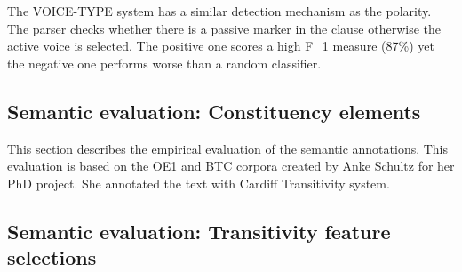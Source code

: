 The VOICE-TYPE system has a similar detection mechanism as the polarity. The parser checks whether there is a passive marker in the clause otherwise the active voice is selected. The positive one scores a high F_1 measure (87\%) yet the negative one performs worse than a random classifier.

\subsection{Semantic evaluation: Constituency elements}

This section describes the empirical evaluation of the semantic annotations. This evaluation is based on the OE1 and BTC corpora created by Anke Schultz for her PhD project. She annotated the text with Cardiff Transitivity system.

\subsection{Semantic evaluation: Transitivity feature selections}


%

